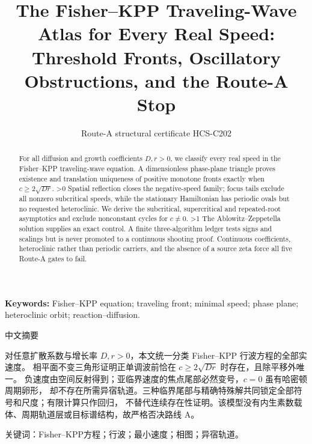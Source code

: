 \documentclass[9pt]{extarticle}
\title{The Fisher--KPP Traveling-Wave Atlas for Every Real Speed:
Threshold Fronts, Oscillatory Obstructions, and the Route-A Stop}
\author{Route-A structural certificate HCS-C202}
\date{}
\begin{document}
\maketitle
\begin{abstract}
For all diffusion and growth coefficients $D,r>0$, we classify every real
speed in the Fisher--KPP traveling-wave equation.  A dimensionless
phase-plane triangle proves existence and translation uniqueness of positive
monotone fronts exactly when $c\ge2\sqrt{Dr}$.
\ifnum\CRevisionRound>0
Spatial reflection closes the negative-speed family; focus tails exclude all
nonzero subcritical speeds, while the stationary Hamiltonian has periodic
ovals but no requested heteroclinic.  We derive the subcritical,
supercritical and repeated-root asymptotics and exclude nonconstant cycles for
$c\ne0$.
\fi
\ifnum\CRevisionRound>1
The Ablowitz--Zeppetella solution supplies an exact control.  A finite
three-algorithm ledger tests signs and scalings but is never promoted to a
continuous shooting proof.  Continuous coefficients, heteroclinic rather
than periodic carriers, and the absence of a source zeta force all five
Route-A gates to fail.
\fi
\end{abstract}
\noindent\textbf{Keywords:} Fisher--KPP equation; traveling front; minimal
speed; phase plane; heteroclinic orbit; reaction--diffusion.

\begin{otherlanguage}{chinese-simplified}
\begin{center}{\large 中文摘要}\end{center}
对任意扩散系数与增长率 $D,r>0$，本文统一分类
\foreignlanguage{english}{Fisher--KPP} 行波方程的全部实速度。
相平面不变三角形证明正单调波前恰在 $c\ge2\sqrt{Dr}$ 时存在，且除平移外唯一。
负速度由空间反射得到；亚临界速度的焦点尾部必然变号，$c=0$ 虽有哈密顿周期卵形，
却不存在所需异宿轨道。三种临界尾部与精确特殊解共同锁定全部符号和尺度；有限计算只作回归，
不替代连续存在性证明。该模型没有内生素数载体、周期轨道层或目标谱结构，故严格否决路线
\foreignlanguage{english}{A}。

\noindent 关键词：\foreignlanguage{english}{Fisher--KPP}方程；行波；最小速度；相图；异宿轨道。
\end{otherlanguage}
\end{document}
